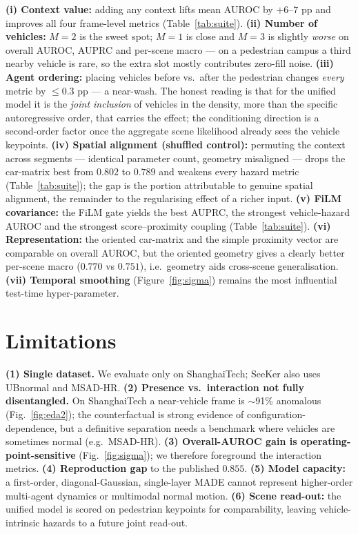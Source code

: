 \documentclass{article}
\begin{document}
\textbf{(i) Context value:} adding any context lifts mean AUROC by $+6$--$7$ pp and
improves all four frame-level metrics (Table~\ref{tab:suite}). \textbf{(ii) Number
of vehicles:} $M{=}2$ is the sweet spot; $M{=}1$ is close and $M{=}3$ is slightly
\emph{worse} on overall AUROC, AUPRC and per-scene macro --- on a pedestrian
campus a third nearby vehicle is rare, so the extra slot mostly contributes
zero-fill noise. \textbf{(iii) Agent ordering:} placing vehicles before vs.\ after
the pedestrian changes \emph{every} metric by $\le 0.3$ pp --- a near-wash. The
honest reading is that for the unified model it is the \emph{joint inclusion} of
vehicles in the density, more than the specific autoregressive order, that carries
the effect; the conditioning direction is a second-order factor once the
aggregate scene likelihood already sees the vehicle keypoints. \textbf{(iv)
Spatial alignment (shuffled control):} permuting the context across segments ---
identical parameter count, geometry misaligned --- drops the car-matrix best from
$0.802$ to $0.789$ and weakens every hazard metric (Table~\ref{tab:suite}); the
gap is the portion attributable to genuine spatial alignment, the remainder to the
regularising effect of a richer input. \textbf{(v) FiLM covariance:} the FiLM gate
yields the best AUPRC, the strongest vehicle-hazard AUROC and the strongest
score--proximity coupling (Table~\ref{tab:suite}). \textbf{(vi) Representation:}
the oriented car-matrix and the simple proximity vector are comparable on overall
AUROC, but the oriented geometry gives a clearly better per-scene macro
($0.770$ vs $0.751$), i.e.\ geometry aids cross-scene generalisation.
\textbf{(vii) Temporal smoothing} (Figure~\ref{fig:sigma}) remains the most
influential test-time hyper-parameter.

\section{Limitations}
\label{sec:limitations}
\textbf{(1) Single dataset.} We evaluate only on ShanghaiTech; SeeKer also uses
UBnormal and MSAD-HR. \textbf{(2) Presence vs.\ interaction not fully
disentangled.} On ShanghaiTech a near-vehicle frame is $\sim$91\% anomalous
(Fig.~\ref{fig:eda2}); the counterfactual is strong evidence of
configuration-dependence, but a definitive separation needs a benchmark where
vehicles are sometimes normal (e.g.\ MSAD-HR). \textbf{(3) Overall-AUROC gain is
operating-point-sensitive} (Fig.~\ref{fig:sigma}); we therefore foreground the
interaction metrics. \textbf{(4) Reproduction gap} to the published $0.855$.
\textbf{(5) Model capacity:} a first-order, diagonal-Gaussian, single-layer MADE
cannot represent higher-order multi-agent dynamics or multimodal normal motion.
\textbf{(6) Scene read-out:} the unified model is scored on pedestrian keypoints
for comparability, leaving vehicle-intrinsic hazards to a future joint read-out.
\end{document}
